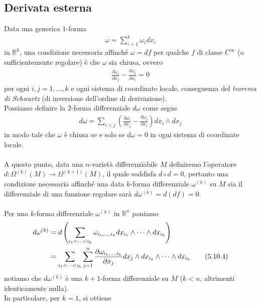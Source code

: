 \documentclass{article}
\begin{document}
\subsection{Derivata esterna}
Data una generica $1$-forma 
\begin{align}
    \omega = \sum_{i = 1}^k \omega_i dx_i \tag{5.10.1}
\end{align}
in $\mathbb{R}^k$, una condizione necessaria affinché $\omega = df$ per qualche $f$ di classe $C^\infty$ (o sufficientemente regolare) è che $\omega$ sia chiusa, ovvero
\begin{align}
    \frac{\partial \omega_i}{\partial x_j} - \frac{\partial \omega_j}{\partial x_i} = 0 \tag{5.10.2}
\end{align}
per ogni $i, j = 1, \dots, k$ e ogni sistema di coordinate locale, conseguenza del \textit{teorema di Schwartz} (di inversione dell'ordine di derivazione). \\
Possiamo definire la $2$-forma differenziale $d\omega$ come segue
\begin{align}
    d\omega = \sum_{i < j} \left(\frac{\partial \omega_i}{\partial x_j} - \frac{\partial \omega_j}{\partial x_i}\right)dx_i \wedge dx_j \tag{5.10.3}
\end{align}
in modo tale che $\omega$ è chiusa se e solo se $d\omega = 0$ in ogni sistema di coordinate locale. \\ \\
A questo punto, data una $n$-varietà differenziabile $M$ definiremo l'operatore $d : \Omega^{(k)}(M) \longrightarrow \Omega^{(k + 1)}(M)$, il quale soddisfa $d \circ d = 0$, pertanto una condizione necessaria affinché una data $k$-forma differenziale $\omega^{(k)}$ su $M$ sia il differenziale di una funzione regolare sarà $d\omega^{(k)} = d(df) = 0$. \\ \\
Per una $k$-forma differenziale $\omega^{(k)}$ in $\mathbb{R}^n$ poniamo
\begin{align}
    d\omega^{(k)} &= d\left(\sum_{i_1 < \dots < i_k} \omega_{i_1, \dots, i_k}dx_{i_1} \wedge \dots \wedge dx_{i_k}\right) \notag \\
    &= \sum_{i_1 < \dots < i_k}\sum_{j = 1}^n \frac{\partial \omega_{i_1, \dots, i_k}}{\partial x_j}dx_j \wedge dx_{i_1} \wedge \dots \wedge dx_{i_k} \tag{5.10.4}
\end{align}
notiamo che $d\omega^{(k)}$ è una $k + 1$-forma differenziale su $M$ ($k < n$, altrimenti identicamente nulla). \\
In particolare, per $k = 1$, si ottiene
\end{document}
